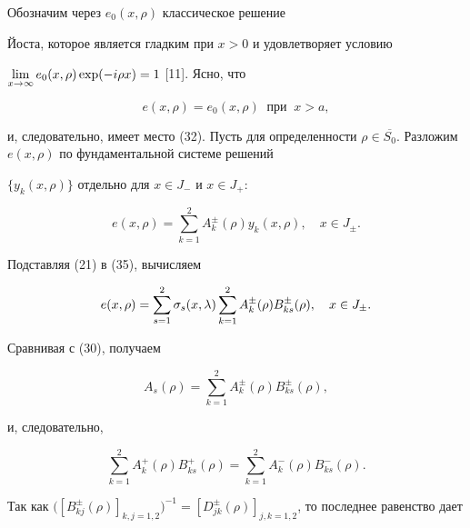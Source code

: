 \begin{pf}


Обозначим через $e_0(x,\rho)$ классическое решение


Йоста, которое является гладким при $x>0$ и удовлетворяет условию


$\lim\limits_{x\to\infty} e_0(x,\rho)\exp(-i\rho x)=1$ [11]. Ясно, что


\begin{equation}


e(x,\rho)=e_0(x,\rho)\ \text{ при } \ x>a,


\end{equation}


и, следовательно, имеет место (32). Пусть для определенности $\rho\in


\overline{S_0}$. Разложим $e(x,\rho)$ по фундаментальной системе решений


$\{y_k(x,\rho)\}$ отдельно для $x\in J_{-}$ и $x\in J_{+}$:


\begin{equation}


e(x,\rho)= \sum_{k=1}^{2}


A_{k}^{\pm}(\rho)y_k(x,\rho),\quad x\in J_{\pm}.


\end{equation}


Подставляя (21) в (35), вычисляем


$$


e(x,\rho)= \sum_{s=1}^{2}\sigma_s(x,\la)\sum_{k=1}^{2}


A_{k}^{\pm}(\rho)B_{ks}^{\pm}(\rho),\quad x\in J_{\pm}.


$$


Сравнивая с (30), получаем


\begin{equation}


A_s(\rho)=\sum_{k=1}^{2}A_{k}^{\pm}(\rho)B_{ks}^{\pm}(\rho),


\end{equation}


и, следовательно,


$$


\sum_{k=1}^{2} A_{k}^{+}(\rho)B_{ks}^{+}(\rho)=


\sum_{k=1}^{2} A_{k}^{-}(\rho)B_{ks}^{-}(\rho).


$$


Так как $\big([B_{kj}^{\pm}(\rho)]_{k,j=1,2}\big)^{-1}=


[D_{jk}^{\pm}(\rho)]_{j,k=1,2}$, то последнее равенство дает



\end{pf}
